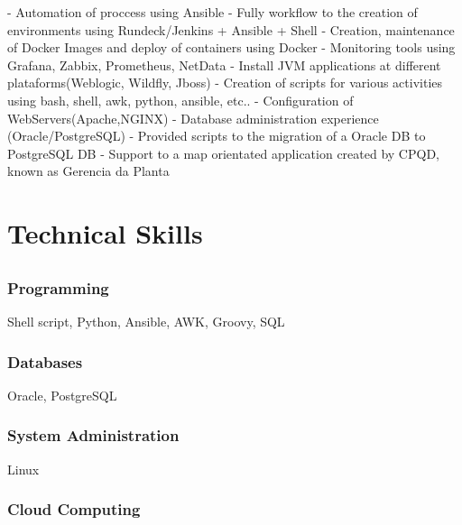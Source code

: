 \documentclass{article}
\begin{document}
- Automation of proccess using Ansible \newline
- Fully workflow to the creation of environments using Rundeck/Jenkins + Ansible + Shell \newline
- Creation, maintenance of Docker Images and deploy of containers using Docker \newline
- Monitoring tools using Grafana, Zabbix, Prometheus, NetData \newline
- Install JVM applications at different plataforms(Weblogic, Wildfly, Jboss) \newline
- Creation of scripts for various activities using bash, shell, awk, python, ansible, etc.. \newline
- Configuration of WebServers(Apache,NGINX) \newline
- Database administration experience (Oracle/PostgreSQL) \newline
- Provided scripts to the migration of a Oracle DB to PostgreSQL DB \newline
- Support to a map orientated application created by CPQD, known as Gerencia da Planta

\section{Technical Skills}

\subsection{}

\subsubsection{Programming}

Shell script, Python, Ansible, AWK, Groovy, SQL

\subsubsection{Databases}

Oracle, PostgreSQL

\subsubsection{System Administration}

Linux

\subsubsection{Cloud Computing}
\end{document}
